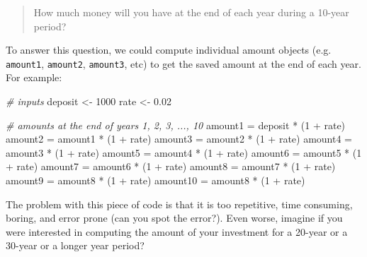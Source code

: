 \documentclass[
]{book}
\newenvironment{Shaded}{\begin{snugshade}}{\end{snugshade}}
\newcommand{\CommentTok}[1]{\textcolor[rgb]{0.56,0.35,0.01}{\textit{#1}}}
\newcommand{\DecValTok}[1]{\textcolor[rgb]{0.00,0.00,0.81}{#1}}
\newcommand{\FloatTok}[1]{\textcolor[rgb]{0.00,0.00,0.81}{#1}}
\newcommand{\NormalTok}[1]{#1}
\newcommand{\OtherTok}[1]{\textcolor[rgb]{0.56,0.35,0.01}{#1}}
\newcommand{\SpecialCharTok}[1]{\textcolor[rgb]{0.00,0.00,0.00}{#1}}
\begin{document}
\begin{quote}
How much money will you have at the end of each year during a 10-year period?
\end{quote}

To answer this question, we could compute individual amount objects (e.g.~
\texttt{amount1}, \texttt{amount2}, \texttt{amount3}, etc) to get the saved amount at the end of
each year. For example:

\begin{Shaded}
\begin{Highlighting}[]
\CommentTok{\# inputs}
\NormalTok{deposit }\OtherTok{\textless{}{-}} \DecValTok{1000}
\NormalTok{rate }\OtherTok{\textless{}{-}} \FloatTok{0.02}

\CommentTok{\# amounts at the end of years 1, 2, 3, ..., 10}
\NormalTok{amount1 }\OtherTok{=}\NormalTok{ deposit }\SpecialCharTok{*}\NormalTok{ (}\DecValTok{1} \SpecialCharTok{+}\NormalTok{ rate)}
\NormalTok{amount2 }\OtherTok{=}\NormalTok{ amount1 }\SpecialCharTok{*}\NormalTok{ (}\DecValTok{1} \SpecialCharTok{+}\NormalTok{ rate)}
\NormalTok{amount3 }\OtherTok{=}\NormalTok{ amount2 }\SpecialCharTok{*}\NormalTok{ (}\DecValTok{1} \SpecialCharTok{+}\NormalTok{ rate)}
\NormalTok{amount4 }\OtherTok{=}\NormalTok{ amount3 }\SpecialCharTok{*}\NormalTok{ (}\DecValTok{1} \SpecialCharTok{+}\NormalTok{ rate)}
\NormalTok{amount5 }\OtherTok{=}\NormalTok{ amount4 }\SpecialCharTok{*}\NormalTok{ (}\DecValTok{1} \SpecialCharTok{+}\NormalTok{ rate)}
\NormalTok{amount6 }\OtherTok{=}\NormalTok{ amount5 }\SpecialCharTok{*}\NormalTok{ (}\DecValTok{1} \SpecialCharTok{+}\NormalTok{ rate)}
\NormalTok{amount7 }\OtherTok{=}\NormalTok{ amount6 }\SpecialCharTok{*}\NormalTok{ (}\DecValTok{1} \SpecialCharTok{+}\NormalTok{ rate)}
\NormalTok{amount8 }\OtherTok{=}\NormalTok{ amount7 }\SpecialCharTok{*}\NormalTok{ (}\DecValTok{1} \SpecialCharTok{+}\NormalTok{ rate)}
\NormalTok{amount9 }\OtherTok{=}\NormalTok{ amount8 }\SpecialCharTok{*}\NormalTok{ (}\DecValTok{1} \SpecialCharTok{+}\NormalTok{ rate)}
\NormalTok{amount10 }\OtherTok{=}\NormalTok{ amount8 }\SpecialCharTok{*}\NormalTok{ (}\DecValTok{1} \SpecialCharTok{+}\NormalTok{ rate)}
\end{Highlighting}
\end{Shaded}

The problem with this piece of code is that it is too repetitive, time consuming,
boring, and error prone (can you spot the error?). Even worse, imagine if you
were interested in computing the amount of your investment for a 20-year or
a 30-year or a longer year period?
\end{document}
